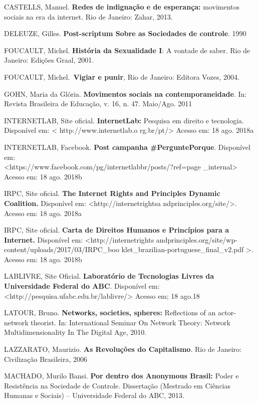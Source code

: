 CASTELLS, Manuel. \textbf{Redes de indignação e de esperança:}
movimentos sociais na era da internet. Rio de Janeiro: Zahar, 2013.

DELEUZE, Gilles. \textbf{Post-scriptum Sobre as Sociedades de controle}.
1990

FOUCAULT, Michel. \textbf{História da Sexualidade I}: A vontade de
saber. Rio de Janeiro: Edições Graal, 2001.

FOUCAULT, Michel.~\textbf{Vigiar e punir}, Rio de Janeiro: Editora
Vozes, 2004.

GOHN, Maria da Glória. \textbf{Movimentos sociais na contemporaneidade}.
In: Revista Brasileira de Educação, v. 16, n. 47. Maio/Ago. 2011

INTERNETLAB, Site oficial. \textbf{InternetLab:} Pesquisa em direito e
tecnologia. Disponível em: \textless{}
http://www.internetlab.o
rg.br/pt/\textgreater{} Acesso em: 18 ago. 2018a

INTERNETLAB, Facebook. \textbf{Post campanha \#PerguntePorque}.
Disponível em:\\
\textless{}https://www.facebook.com/pg/internetlabbr/posts/?ref=page
\_internal\textgreater{}
Acesso em: 18 ago. 2018b

IRPC, Site oficial. \textbf{The Internet Rights and Principles Dynamic
Coalition.} Disponível em:
\textless{}http://internetrightsa
ndprinciples.org/site/\textgreater{}.
Acesso em: 18 ago. 2018a

IRPC, Site oficial. \textbf{Carta de Direitos Humanos e Princípios para
a Internet.} Disponível em:
\textless{}http://internetrights
andprinciples.org/site/wp-content/uploads/2017/03/IRPC\_boo
klet\_brazilian-portuguese\_final\_v2.pdf
\textgreater{}. Acesso em: 18 ago. 2018b

LABLIVRE, Site Oficial. \textbf{Laboratório de Tecnologias Livres da
Universidade Federal do ABC}. Disponível em:
\textless{}http://pesquisa.ufabc.edu.br/lablivre/\textgreater{} Acesso
em; 18 ago.18

LATOUR, Bruno. \textbf{Networks, societies, spheres:} Reflections of an
actor-network theorist. In: International Seminar On Network Theory:
Network Multidimensionality In The Digital Age, 2010.

LAZZARATO, Maurizio. \textbf{As Revoluções do Capitalismo}. Rio de
Janeiro: Civilização Brasileira, 2006

MACHADO, Murilo Bansi. \textbf{Por dentro dos Anonymous Brasil:} Poder e
Resistência na Sociedade de Controle. Dissertação (Mestrado em Ciências
Humanas e Sociais) -- Universidade Federal do ABC, 2013.

